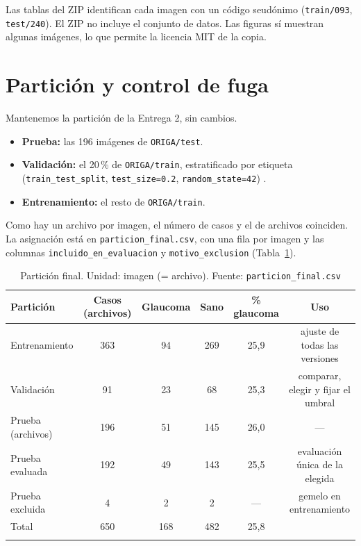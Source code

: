 \documentclass[pdflatex,sn-mathphys-num]{sn-jnl}%
\theoremstyle{thmstyleone}%
\theoremstyle{thmstyletwo}%
\theoremstyle{thmstylethree}%
\begin{document}
Las tablas del ZIP identifican cada imagen con un código seudónimo (\texttt{train/093}, \texttt{test/240}). El ZIP no incluye el conjunto de datos. Las figuras sí muestran algunas imágenes, lo que permite la licencia MIT de la copia.

\FloatBarrier
\section{Partición y control de fuga}\label{sec:particion}

Mantenemos la partición de la Entrega 2, sin cambios.
\begin{itemize}\raggedright
\item \textbf{Prueba:} las 196 imágenes de \texttt{ORIGA/test}.
\item \textbf{Validación:} el 20\,\% de \texttt{ORIGA/train}, estratificado por etiqueta (\texttt{train\_test\_split}, \texttt{test\_size=0.2}, \texttt{random\_state=42}) \cite{pedregosa2011scikit}.
\item \textbf{Entrenamiento:} el resto de \texttt{ORIGA/train}.
\end{itemize}
Como hay un archivo por imagen, el número de casos y el de archivos coinciden. La asignación está en \texttt{particion\_final.csv}, con una fila por imagen y las columnas \texttt{incluido\_en\_evaluacion} y \texttt{motivo\_exclusion} (Tabla~\ref{tab:particion}).

\begin{table}[htbp]
\caption{Partición final. Unidad: imagen (= archivo). Fuente: \texttt{particion\_final.csv}}\label{tab:particion}
\begin{tabular*}{\textwidth}{@{\extracolsep\fill}lccccc}
\toprule
Partición & Casos (archivos) & Glaucoma & Sano & \% glaucoma & Uso \\
\midrule
Entrenamiento & 363 & 94 & 269 & 25,9 & ajuste de todas las versiones \\
Validación & 91 & 23 & 68 & 25,3 & comparar, elegir y fijar el umbral \\
Prueba (archivos) & 196 & 51 & 145 & 26,0 & --- \\
\quad Prueba evaluada & 192 & 49 & 143 & 25,5 & evaluación única de la elegida \\
\quad Prueba excluida & 4 & 2 & 2 & --- & gemelo en entrenamiento \\
\midrule
Total & 650 & 168 & 482 & 25,8 & \\
\botrule
\end{tabular*}
\end{table}
\end{document}
